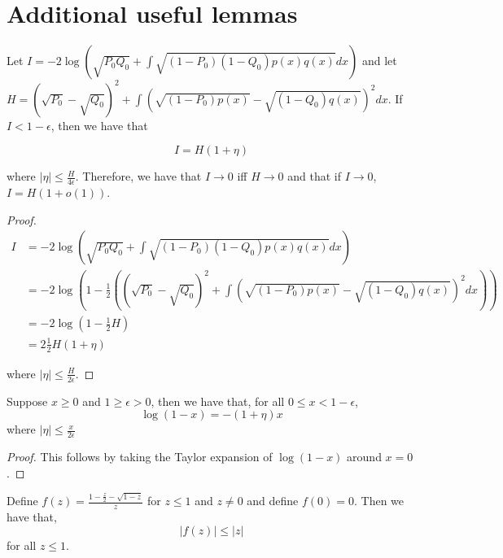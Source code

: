 \section{Additional useful lemmas}

\begin{lemma}
\label{lem:renyi_hellinger}
Let $I = -2 \log \left( \sqrt{P_0 Q_0} + \int \sqrt{(1-P_0)(1-Q_0) p(x) q(x)} dx \right)$ and let $H = (\sqrt{P_0} - \sqrt{Q_0})^2 + \int \left( \sqrt{ (1-P_0) p(x)} - \sqrt{ (1-Q_0) q(x)} \right)^2 dx$. If $I < 1- \epsilon$, then we have that

\[
I = H(1+\eta)
\]

where $|\eta| \leq \frac{H}{4\epsilon}$. Therefore, we have that $I \rightarrow 0$ iff $H \rightarrow 0$ and that if $I \rightarrow 0$, $ I = H(1+o(1))$.

\end{lemma}

\begin{proof}

\begin{align*}
I &= -2 \log \left( \sqrt{P_0 Q_0} + \int \sqrt{(1-P_0)(1-Q_0) p(x) q(x)} dx \right) \\
  &= -2 \log \left( 1 - \frac{1}{2} \left( 
                (\sqrt{P_0} - \sqrt{Q_0})^2 + 
               \int (\sqrt{(1-P_0)p(x)} - \sqrt{(1-Q_0)q(x)} )^2 dx \right) \right)\\
 &= -2 \log \left(1 - \frac{1}{2} H \right) \\
  &= 2 \frac{1}{2} H (1 + \eta)
\end{align*}

where $|\eta| \leq \frac{H}{2 \epsilon}$. 
\end{proof}

\begin{lemma}
Suppose $x \geq 0$ and $1 \geq \epsilon > 0$, then we have that, for all $0 \leq x < 1-\epsilon$,
\[
\log (1 - x) = - (1 + \eta) x 
\]
where $| \eta| \leq \frac{x}{2 \epsilon}$
\end{lemma}

\begin{proof}
This follows by taking the Taylor expansion of $\log (1 - x)$ around $x = 0$.
\end{proof}

\begin{lemma}
\label{lem:sqrt_linearize}
Define $f(z) =  \frac{1 - \frac{z}{2} - \sqrt{ 1 - z}}{z} $ for $z \leq 1$ and $z \neq 0$ and define $f(0) = 0$. Then we have that,
\[
\left| f(z)  \right| \leq |z|
\]
for all $z \leq 1$.
\end{lemma}

